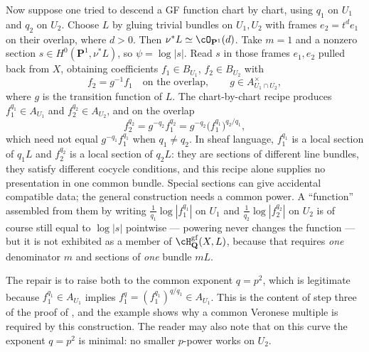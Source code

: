 \begin{example}
Now suppose one tried to descend a GF function chart by chart, using
$q_1$ on $U_1$ and $q_2$ on $U_2$.
Choose $L$ by gluing trivial bundles on $U_1,U_2$ with frames
$e_2=t^d e_1$ on their overlap, where $d>0$.
Then $\nu^*L\simeq\cO_{\mathbf P^1}(d)$.
Take $m=1$ and a nonzero section $s\in H^0(\mathbf P^1,\nu^*L)$,
so $\psi=\log|s|$.  Read $s$ in those frames $e_1,e_2$
pulled back from $X$, obtaining coefficients $f_1\in B_{U_1}$,
$f_2\in B_{U_2}$ with
\[
 f_2=g^{-1}f_1
 \quad\text{on the overlap},
 \qquad
 g\in A_{U_1\cap U_2}^\times ,
\]
where $g$ is the transition function of $L$.  The chart-by-chart recipe
produces $f_1^{q_1}\in A_{U_1}$ and $f_2^{q_2}\in A_{U_2}$, and on the
overlap
\[
 f_2^{q_2}=g^{-q_2}f_1^{q_2}
 =g^{-q_2}\bigl(f_1^{q_1}\bigr)^{q_2/q_1},
\]
which need not equal $g^{-q_1}f_1^{q_1}$ when $q_1\ne q_2$.  In sheaf
language, $f_1^{q_1}$ is a local section of $q_1L$ and $f_2^{q_2}$ is a
local section of $q_2L$: they are sections of different line bundles, they
satisfy different cocycle conditions, and this recipe alone supplies
no presentation in one common bundle.  Special sections can give
accidental compatible data; the general construction needs a common power.  A ``function'' assembled from them by
writing $\frac1{q_1}\log|f_1^{q_1}|$ on $U_1$ and
$\frac1{q_2}\log|f_2^{q_2}|$ on $U_2$ is of course still equal to
$\log|s|$ pointwise --- powering never changes the function --- but it is
not exhibited as a member of $\cH^{\mathrm{gf}}_{\mathbf Q}(X,L)$, because
that requires \emph{one} denominator $m$ and sections of \emph{one}
bundle $mL$.

The repair is to raise both to the common exponent $q=p^2$, which is
legitimate because $f_1^{q_1}\in A_{U_1}$ implies
$f_1^{q}=(f_1^{q_1})^{q/q_1}\in A_{U_1}$.  This is the content of
step three of the proof of , and the example
shows why a common Veronese multiple is required by this construction.  The reader may
also note that on this curve the exponent $q=p^2$ is minimal: no smaller
$p$-power works on $U_2$.
\end{example}

